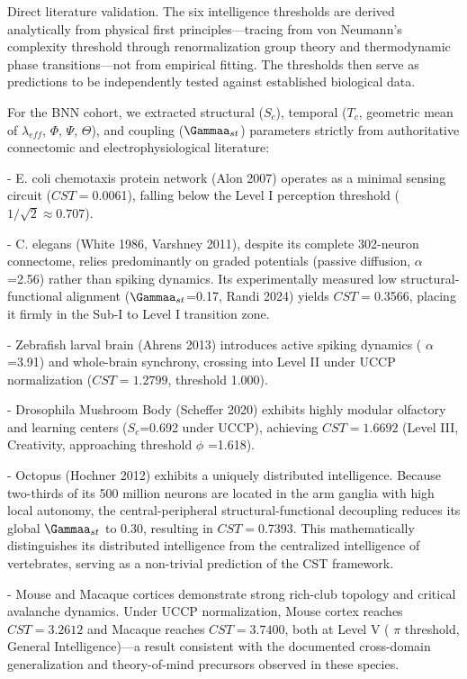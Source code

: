 \documentclass[a4paper,12pt]{article}
\begin{document}
Direct literature validation. The six intelligence thresholds are derived analytically from physical first principles---tracing from von Neumann's complexity threshold through renormalization group theory and thermodynamic phase transitions---not from empirical fitting. The thresholds then serve as predictions to be independently tested against established biological data.

For the BNN cohort, we extracted structural ($S_{c}$), temporal ($T_{c}$, geometric mean of $\lambda_{eff}$, $\Phi$, $\Psi$, $\Theta$), and coupling ($\Gammaa_{st}$) parameters strictly from authoritative connectomic and electrophysiological literature:

- E. coli chemotaxis protein network (Alon 2007) operates as a minimal sensing circuit ($CST = $0.0061), falling below the Level I perception threshold ($1/\sqrt{2} \approx 0.707$).

- C. elegans (White 1986, Varshney 2011), despite its complete 302-neuron connectome, relies predominantly on graded potentials (passive diffusion,  $\alpha$ =2.56) rather than spiking dynamics. Its experimentally measured low structural-functional alignment ($\Gammaa_{st}$=0.17, Randi 2024) yields $CST = $0.3566, placing it firmly in the Sub-I to Level I transition zone.

- Zebrafish larval brain (Ahrens 2013) introduces active spiking dynamics ( $\alpha$ =3.91) and whole-brain synchrony, crossing into Level II under UCCP normalization ($CST = 1.2799$, threshold 1.000).

- Drosophila Mushroom Body (Scheffer 2020) exhibits highly modular olfactory and learning centers ($S_{c}$=0.692 under UCCP), achieving $CST = 1.6692$ (Level III, Creativity, approaching threshold  $\phi$ =1.618).

- Octopus (Hochner 2012) exhibits a uniquely distributed intelligence. Because two-thirds of its 500 million neurons are located in the arm ganglia with high local autonomy, the central-peripheral structural-functional decoupling reduces its global $\Gammaa_{st}$ to 0.30, resulting in $CST = $0.7393. This mathematically distinguishes its distributed intelligence from the centralized intelligence of vertebrates, serving as a non-trivial prediction of the CST framework.

- Mouse and Macaque cortices demonstrate strong rich-club topology and critical avalanche dynamics. Under UCCP normalization, Mouse cortex reaches $CST = 3.2612$ and Macaque reaches $CST = 3.7400$, both at Level V ( $\pi$  threshold, General Intelligence)---a result consistent with the documented cross-domain generalization and theory-of-mind precursors observed in these species.
\end{document}
